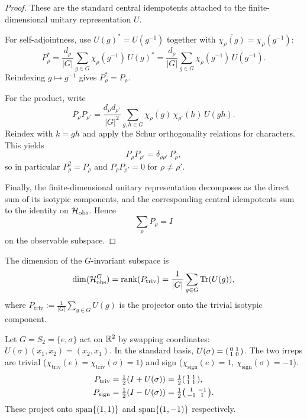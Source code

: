 \begin{proof}
These are the standard central idempotents attached to the finite-dimensional
unitary representation \(U\).

For self-adjointness, use \(U(g)^* = U(g^{-1})\) together with
\(\overline{\chi_\rho(g)} = \chi_\rho(g^{-1})\):
\[
P_\rho^*
=
\frac{d_\rho}{|G|}\sum_{g\in G} \chi_\rho(g^{-1})\,U(g)^*
=
\frac{d_\rho}{|G|}\sum_{g\in G} \chi_\rho(g^{-1})\,U(g^{-1}).
\]
Reindexing \(g \mapsto g^{-1}\) gives \(P_\rho^* = P_\rho\).

For the product, write
\[
P_\rho P_{\rho'}
=
\frac{d_\rho d_{\rho'}}{|G|^2}
\sum_{g,h\in G}
\overline{\chi_\rho(g)}\,
\overline{\chi_{\rho'}(h)}\,
U(gh).
\]
Reindex with \(k = gh\) and apply the Schur orthogonality relations for
characters. This yields
\[
P_\rho P_{\rho'} = \delta_{\rho\rho'}\,P_\rho,
\]
so in particular \(P_\rho^2 = P_\rho\) and \(P_\rho P_{\rho'} = 0\) for
\(\rho \neq \rho'\).

Finally, the finite-dimensional unitary representation decomposes as the direct
sum of its isotypic components, and the corresponding central idempotents sum
to the identity on \(\mathcal{H}_{\mathrm{obs}}\). Hence
\[
\sum_\rho P_\rho = I
\]
on the observable subspace.
\end{proof}

\begin{corollary}
\label{cor:invariant-dimension}
The dimension of the $G$-invariant subspace is
\[
\dim(\mathcal{H}_{\mathrm{obs}}^G) = \mathrm{rank}(P_{\mathrm{triv}}) = \frac{1}{|G|} \sum_{g \in G} \mathrm{Tr}(U(g)),
\]
where $P_{\mathrm{triv}} := \frac{1}{|G|} \sum_{g \in G} U(g)$ is the projector onto the trivial isotypic component.
\end{corollary}

\begin{example}
\label{ex:s2-projectors}
Let $G = S_2 = \{e, \sigma\}$ act on $\mathbb{R}^2$ by swapping coordinates: $U(\sigma)(x_1, x_2) = (x_2, x_1)$.
In the standard basis, $U(\sigma) = \begin{psmallmatrix} 0 & 1 \\ 1 & 0 \end{psmallmatrix}$.
The two irreps are trivial ($\chi_{\mathrm{triv}}(e) = \chi_{\mathrm{triv}}(\sigma) = 1$) and sign ($\chi_{\mathrm{sign}}(e) = 1$, $\chi_{\mathrm{sign}}(\sigma) = -1$).
\begin{align*}
P_{\mathrm{triv}} &= \tfrac{1}{2}(I + U(\sigma)) = \tfrac{1}{2}\begin{psmallmatrix} 1 & 1 \\ 1 & 1 \end{psmallmatrix}, \\
P_{\mathrm{sign}} &= \tfrac{1}{2}(I - U(\sigma)) = \tfrac{1}{2}\begin{psmallmatrix} 1 & -1 \\ -1 & 1 \end{psmallmatrix}.
\end{align*}
These project onto $\mathrm{span}\{(1,1)\}$ and $\mathrm{span}\{(1,-1)\}$ respectively.
\end{example}

